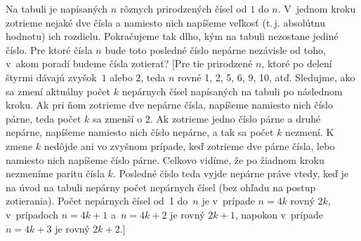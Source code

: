 {Na tabuli je napísaných $n$ rôznych prirodzených čísel od $1$ do
$n$. V~jednom kroku zotrieme nejaké dve čísla a namiesto nich
napíšeme veľkosť (t.\,j. absolútnu hodnotu) ich rozdielu.
Pokračujeme tak dlho, kým na tabuli nezostane jediné
číslo. Pre ktoré čísla $n$ bude toto posledné číslo nepárne
nezávisle od toho, v~akom poradí budeme čísla zotierať?
[Pre tie prirodzené $n$, ktoré po delení štyrmi
dávajú zvyšok~$1$ alebo $2$, teda $n$ rovné 1, 2, 5, 6, 9, 10, atď.
Sledujme, ako sa zmení aktuálny počet $k$ nepárnych čísel
napísaných na tabuli po následnom kroku. Ak pri ňom zotrieme dve
nepárne čísla, napíšeme namiesto nich číslo párne, teda počet $k$ sa
zmenší o 2. Ak zotrieme jedno číslo párne a druhé nepárne,
napíšeme namiesto nich číslo nepárne, a tak sa počet $k$ nezmení.
K zmene $k$ nedôjde ani vo zvyšnom prípade, keď zotrieme dve párne
čísla, lebo namiesto nich napíšeme číslo párne. Celkovo vidíme,
že po žiadnom kroku nezmeníme paritu čísla $k$. Posledné číslo
teda vyjde nepárne práve vtedy, keď je na úvod na tabuli
nepárny počet nepárnych čísel (bez ohľadu na postup zotierania).
Počet nepárnych čísel od~1 do~$n$ je v~prípade $n=4k$ rovný $2k$,
v~prípadoch $n=4k+1$ a~$n=4k+2$ je rovný $2k+1$, napokon
v~prípade $n=4k+3$ je rovný $2k+2$.]

}

